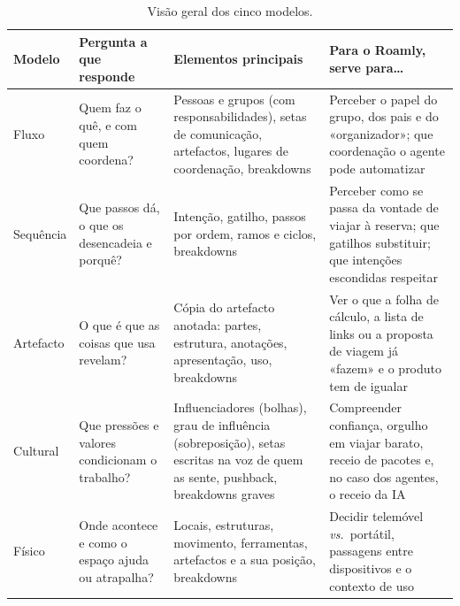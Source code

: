 \documentclass[11pt,a4paper]{article}
\begin{document}
\begin{table}[h]
\centering\small
\begin{tabularx}{\textwidth}{@{}p{2.1cm}p{3.6cm}LL@{}}
\toprule
\textbf{Modelo} & \textbf{Pergunta a que responde} & \textbf{Elementos principais} & \textbf{Para o Roamly, serve para\ldots} \\
\midrule
Fluxo & Quem faz o quê, e com quem coordena? & Pessoas e grupos (com responsabilidades), setas de comunicação, artefactos, lugares de coordenação, breakdowns & Perceber o papel do grupo, dos pais e do «organizador»; que coordenação o agente pode automatizar \\
Sequência & Que passos dá, o que os desencadeia e porquê? & Intenção, gatilho, passos por ordem, ramos e ciclos, breakdowns & Perceber como se passa da vontade de viajar à reserva; que gatilhos substituir; que intenções escondidas respeitar \\
Artefacto & O que é que as coisas que usa revelam? & Cópia do artefacto anotada: partes, estrutura, anotações, apresentação, uso, breakdowns & Ver o que a folha de cálculo, a lista de links ou a proposta de viagem já «fazem» e o produto tem de igualar \\
Cultural & Que pressões e valores condicionam o trabalho? & Influenciadores (bolhas), grau de influência (sobreposição), setas escritas na voz de quem as sente, pushback, breakdowns graves & Compreender confiança, orgulho em viajar barato, receio de pacotes e, no caso dos agentes, o receio da IA \\
Físico & Onde acontece e como o espaço ajuda ou atrapalha? & Locais, estruturas, movimento, ferramentas, artefactos e a sua posição, breakdowns & Decidir telemóvel \emph{vs.}\ portátil, passagens entre dispositivos e o contexto de uso \\
\bottomrule
\end{tabularx}
\caption{Visão geral dos cinco modelos.}
\end{table}
\end{document}
